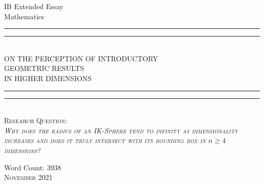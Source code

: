 \begin{titlepage}

    \centering
    \vfill
    
    \large{IB Extended Essay}\\
    \large{Mathematics}\\
    
    \rule{\textwidth}{1.6pt}\vspace*{-\baselineskip}\vspace*{3.2pt}
    \rule{\textwidth}{0.4pt}\\[0.2\baselineskip]
    
    {\LARGE ON THE PERCEPTION OF INTRODUCTORY\\[0.3\baselineskip] GEOMETRIC RESULTS\\[0.5\baselineskip] IN HIGHER DIMENSIONS}\\[0.2\baselineskip]
    
    
    
    \rule{\textwidth}{0.4pt}\vspace*{-\baselineskip}\vspace*{4pt}
    \rule{\textwidth}{1.6pt}\\[\baselineskip]
    \scshape
    \vfill
    Research Question:\\
    \textit{Why  does  the  radius  of  an  IK-Sphere  tend  to  infinity  as  dimensionality increases and does it truly intersect with its bounding box in $n \geq 4$ dimensions?}
    \par
    \vfill
    
    \small{Word Count: 3938} \\
    \vspace*{2\baselineskip}
    {\scshape November 2021} \\
  \end{titlepage}